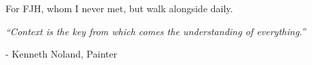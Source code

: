 
\vspace*{\fill}
\begingroup
\begin{center}
{
For FJH, whom I never met, but walk alongside daily.
}
\end{center}
\endgroup
\vspace{9cm}
\begingroup
  {\it
  	``Context is the key from which comes the understanding of everything.''
  }
  \begin{flushright}
    - Kenneth Noland, Painter
  \end{flushright}
\endgroup
\vspace*{\fill}



